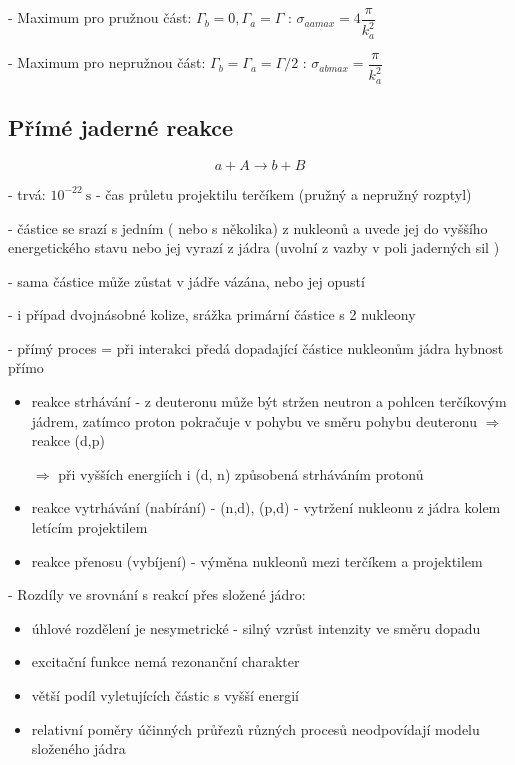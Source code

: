 \documentclass[../../main.tex]{subfiles}
\begin{document}
- Maximum pro pružnou část: $\Gamma_b = 0, \Gamma_a = \Gamma$ : $\sigma_{aamax} = 4  \dfrac{\pi}{k_{a}^{2}}$
	
- Maximum pro nepružnou část: $\Gamma_b = \Gamma_a = \Gamma/2$ : $\sigma_{abmax} = \dfrac{\pi}{k_{a}^{2}}$	

\subsection{Přímé jaderné reakce}

\begin{equation}
a + A \rightarrow b + B
\end{equation}

- trvá: $10^{-22} ~\mathrm{s}$ - čas průletu projektilu terčíkem (pružný a nepružný rozptyl)

- částice se srazí s jedním ( nebo s několika) z nukleonů a uvede jej do vyššího energetického stavu nebo jej vyrazí z jádra (uvolní z vazby v poli jaderných sil )

- sama částice může zůstat v jádře vázána, nebo jej opustí

- i případ dvojnásobné kolize, srážka primární částice s 2 nukleony

- přímý proces = při interakci předá dopadající částice nukleonům jádra hybnost přímo

\begin{itemize}
	\item reakce strhávání - z deuteronu může být stržen neutron a pohlcen terčíkovým jádrem, zatímco proton pokračuje v pohybu ve směru pohybu deuteronu $\Rightarrow$ reakce (d,p)
	
	$\Rightarrow$ při vyšších energiích i (d, n) způsobená strháváním protonů
	
	\item reakce vytrhávání (nabírání) - (n,d), (p,d) - vytržení nukleonu z jádra kolem letícím projektilem
	
	\item reakce přenosu (vybíjení) - výměna nukleonů mezi terčíkem a projektilem
\end{itemize}

- Rozdíly ve srovnání s reakcí přes složené jádro:
\begin{itemize}
	\item úhlové rozdělení je nesymetrické - silný vzrůst intenzity ve směru dopadu
	\item excitační funkce nemá rezonanční charakter 
	\item větší podíl vyletujících částic s vyšší energií
	\item relativní poměry účinných průřezů různých procesů neodpovídají modelu složeného jádra 
\end{itemize}	
\end{document}
